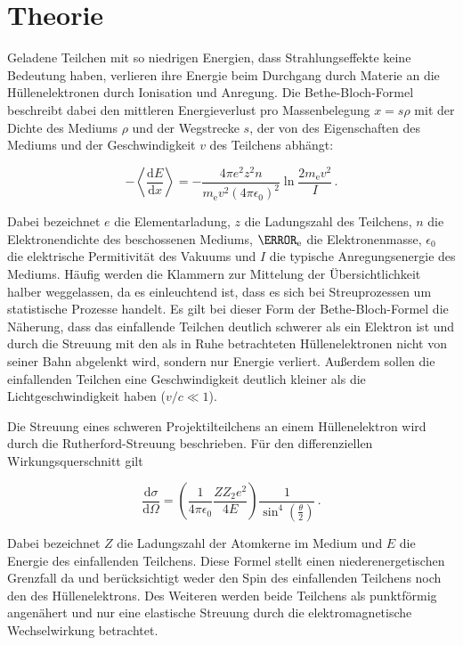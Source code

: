 \section{Theorie}
\label{sec:Theorie}

Geladene Teilchen mit so niedrigen Energien, dass Strahlungseffekte keine Bedeutung haben, verlieren ihre Energie beim Durchgang durch Materie an die Hüllenelektronen durch Ionisation und Anregung. Die Bethe-Bloch-Formel beschreibt dabei den mittleren Energieverlust pro Massenbelegung $x = s \rho$ mit der Dichte des Mediums $\rho$ und der Wegstrecke $s$, der von des Eigenschaften des Mediums und der Geschwindigkeit $v$ des Teilchens abhängt:

\begin{equation}
  -\left<\frac{\mathrm{d}E}{\mathrm{d}x}\right> = - \frac{4\pi e^2 z^2 n}{m_{\mathrm{e}}v^2(4 \pi \epsilon_{\mathrm{0}})^2} \ln{\frac{2 m_{\mathrm{e}} v^2}{I}}\,.
  \label{eqn:bethe}
\end{equation}

Dabei bezeichnet $e$ die Elementarladung, $z$ die Ladungszahl des Teilchens, $n$ die Elektronendichte des beschossenen Mediums, $\m_\text{e}$ die Elektronenmasse, $\epsilon_0$ die elektrische Permitivität des Vakuums und $I$ die typische Anregungsenergie des Mediums. Häufig werden die Klammern zur Mittelung der Übersichtlichkeit halber weggelassen, da es einleuchtend ist, dass es sich bei Streuprozessen um statistische Prozesse handelt.
Es gilt bei dieser Form der Bethe-Bloch-Formel die Näherung, dass das einfallende Teilchen deutlich schwerer als ein Elektron ist und durch die Streuung mit den als in Ruhe betrachteten Hüllenelektronen nicht von seiner Bahn abgelenkt wird, sondern nur Energie verliert. Außerdem sollen die einfallenden Teilchen eine Geschwindigkeit deutlich kleiner als die Lichtgeschwindigkeit haben ($v/c \ll 1$).

Die Streuung eines schweren Projektilteilchens an einem Hüllenelektron wird durch die Rutherford-Streuung beschrieben. Für den differenziellen Wirkungsquerschnitt gilt

\begin{equation}
  \frac{\mathrm{d}\sigma}{\mathrm{d}\Omega} = \left( \frac{1}{4\pi\epsilon_0}\frac{Z Z_2 e^2}{4 E} \right) \frac{1}{\sin^4\left( \frac{\theta}{2} \right)}\,.
  \label{eqn:rutherford}
\end{equation}

Dabei bezeichnet $Z$ die Ladungszahl der Atomkerne im Medium und $E$ die Energie des einfallenden Teilchens.
Diese Formel stellt einen niederenergetischen Grenzfall da und berücksichtigt weder den Spin des einfallenden Teilchens noch den des Hüllenelektrons. Des Weiteren werden beide Teilchens als punktförmig angenähert und nur eine elastische Streuung durch die elektromagnetische Wechselwirkung betrachtet.

